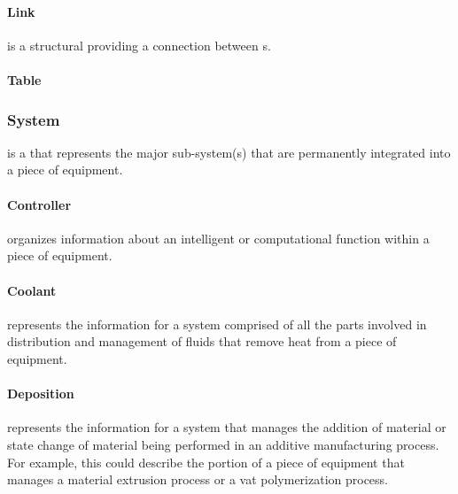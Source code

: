 \paragraph{Link}\mbox{}
\label{sec:Link}


 is a structural  providing a connection between s.



\paragraph{Table}\mbox{}
\label{sec:Table}






\subsubsection{System}
\label{sec:System}



 is a  that represents the major sub-system(s) that are permanently integrated into a piece of equipment.



\paragraph{Controller}\mbox{}
\label{sec:Controller}


 organizes information about an intelligent or computational function within a piece of equipment.



\paragraph{Coolant}\mbox{}
\label{sec:Coolant}


 represents the information for a system comprised of all the parts involved in distribution and management of fluids that remove heat from a piece of equipment.



\paragraph{Deposition}\mbox{}
\label{sec:Deposition}


 represents the information for a system that manages the addition of material or state change of material being performed in an additive manufacturing process.  For example, this could describe the portion of a piece of equipment that manages a material extrusion process or a vat polymerization process.




